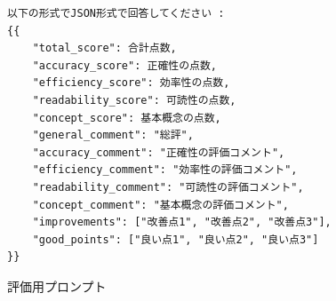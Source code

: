 \documentclass[11pt]{jreport}
\begin{document}
\begin{appendices}
\begin{figure}[!hbt]
\begin{mdframed}[linewidth=1pt]
\begin{lstlisting}
以下の形式でJSON形式で回答してください : 
{{
    "total_score": 合計点数,
    "accuracy_score": 正確性の点数,
    "efficiency_score": 効率性の点数,
    "readability_score": 可読性の点数,
    "concept_score": 基本概念の点数,
    "general_comment": "総評",
    "accuracy_comment": "正確性の評価コメント",
    "efficiency_comment": "効率性の評価コメント",
    "readability_comment": "可読性の評価コメント",
    "concept_comment": "基本概念の評価コメント",
    "improvements": ["改善点1", "改善点2", "改善点3"],
    "good_points": ["良い点1", "良い点2", "良い点3"]
}}
\end{lstlisting}
\end{mdframed}
\caption{評価用プロンプト}
    \label{fig:analyze}
\end{figure}

\end{appendices}
\end{document}
